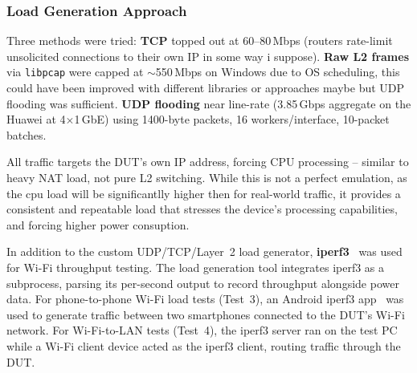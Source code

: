 \documentclass[a4paper,oneside,10pt,ngerman,english]{scrartcl}
\begin{document}
    \subsubsection{Load Generation Approach}
    Three methods were tried: \textbf{\ac{TCP}} topped out at 60--80\,Mbps (routers rate-limit unsolicited connections to their own IP in some way i suppose). \textbf{Raw L2 frames} via \texttt{libpcap} were capped at $\sim$550\,Mbps on Windows due to OS scheduling, this could have been improved with different libraries or approaches maybe but \ac{UDP} flooding was sufficient. \textbf{\ac{UDP} flooding} near line-rate (3.85\,Gbps aggregate on the Huawei at 4$\times$1\,\ac{GbE}) using 1400-byte packets, 16 workers/interface, 10-packet batches.

    All traffic targets the \ac{DUT}'s own IP address, forcing \ac{CPU} processing -- similar to heavy NAT load, not pure L2 switching. While this is not a perfect emulation, as the cpu load will be significantlly higher then for real-world traffic, it provides a consistent and repeatable load that stresses the device's processing capabilities, and forcing higher power consuption.

    In addition to the custom \ac{UDP}/\ac{TCP}/Layer~2 load generator, \textbf{iperf3}~\cite{bib:iperf3} was used for Wi-Fi throughput testing.
    The load generation tool integrates iperf3 as a subprocess, parsing its per-second output to record throughput alongside power data.
    For phone-to-phone Wi-Fi load tests (Test~3), an Android iperf3 app~\cite{bib:iperf3-android} was used to generate traffic between two smartphones connected to the \ac{DUT}'s Wi-Fi network.
    For Wi-Fi-to-\ac{LAN} tests (Test~4), the iperf3 server ran on the test PC while a Wi-Fi client device acted as the iperf3 client, routing traffic through the \ac{DUT}.








\newpage
\printbibliography
\end{document}

